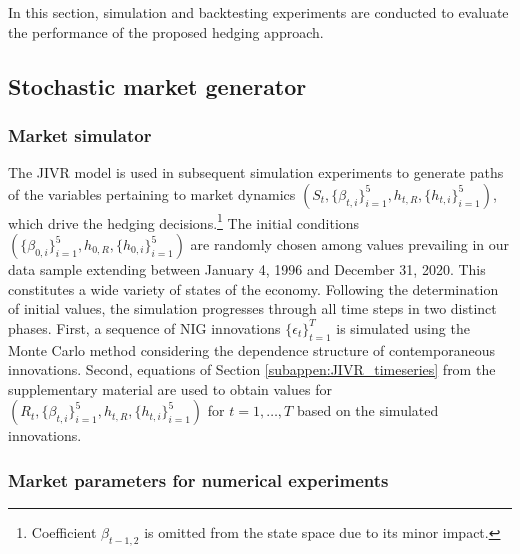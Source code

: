 \documentclass[12pt]{article}
\begin{document}
In this section, simulation and backtesting experiments are conducted to evaluate the performance of the proposed hedging approach.

\subsection{Stochastic market generator}\label{subsec:simulator}

\subsubsection{Market simulator}

The JIVR model is used in subsequent simulation experiments to generate paths of the variables pertaining to market dynamics $(S_{t},\{\beta_{t,i} \}^5_{i=1}, h_{t,R}, \{ h_{t,i}\}^5_{i=1})$, which drive the hedging decisions.\footnote{Coefficient $\beta_{t-1,2}$ is omitted from the state space due to its minor impact.} The initial conditions $\left(\{ \beta_{0,i} \}^5_{i=1}, h_{0,R}, \{ h_{0,i}\}^5_{i=1}  \right)$ are randomly chosen among values prevailing in our data sample extending between January 4, 1996 and December 31, 2020. This constitutes a wide variety of states of the economy. Following the determination of initial values, the simulation progresses through all time steps in two distinct phases. First, a sequence of NIG innovations $\{ \epsilon_{t} \}_{t=1}^{T}$ is simulated using the Monte Carlo method considering the dependence structure of contemporaneous innovations. Second, equations of Section \ref{subappen:JIVR_timeseries} from the supplementary material are used to obtain values for $\left( R_t, \{\beta_{t,i} \}^5_{i=1}, h_{t,R}, \{ h_{t,i}\}^5_{i=1}  \right)$ for $t=1,\ldots,T$ based on the simulated innovations. 




\subsubsection{Market parameters for numerical experiments}
\end{document}
